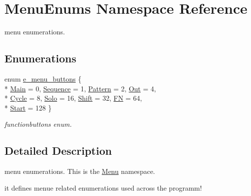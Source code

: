 \hypertarget{namespaceMenuEnums}{\section{Menu\-Enums Namespace Reference}
\label{namespaceMenuEnums}
}


menu enumerations.  


\subsection*{Enumerations}
\begin{DoxyCompactItemize}
\item 
enum \hyperlink{namespaceMenuEnums_a8a0112033fd82b21fb91024f2da815db}{e\-\_\-menu\-\_\-buttons} \{ \\*
\hyperlink{namespaceMenuEnums_a8a0112033fd82b21fb91024f2da815dba35174bcb834b5288e617b5e403916282}{Main} = 0, 
\hyperlink{namespaceMenuEnums_a8a0112033fd82b21fb91024f2da815dbac342bed09bcc9a5d2e4c80c6cbac4e42}{Sequence} = 1, 
\hyperlink{namespaceMenuEnums_a8a0112033fd82b21fb91024f2da815dba3775e44f7da30c57fe300475a573e024}{Pattern} = 2, 
\hyperlink{namespaceMenuEnums_a8a0112033fd82b21fb91024f2da815dbafc27e347494357604e497db2c2a07be0}{Out} = 4, 
\\*
\hyperlink{namespaceMenuEnums_a8a0112033fd82b21fb91024f2da815dbad31732cb8f9cbf4c6d27adcc749bc636}{Cycle} = 8, 
\hyperlink{namespaceMenuEnums_a8a0112033fd82b21fb91024f2da815dbaf1ead4564553031959e56857c8f29b57}{Solo} = 16, 
\hyperlink{namespaceMenuEnums_a8a0112033fd82b21fb91024f2da815dba14c45f0470352eebdf23571c855bb77d}{Shift} = 32, 
\hyperlink{namespaceMenuEnums_a8a0112033fd82b21fb91024f2da815dba9bb0e4755281d36cb67e663da534171b}{F\-N} = 64, 
\\*
\hyperlink{namespaceMenuEnums_a8a0112033fd82b21fb91024f2da815dba91e3e422ba63a9de93a637f0dd7ffbf5}{Start} = 128
 \}
\begin{DoxyCompactList}\small\item\em functionbuttons enum. \end{DoxyCompactList}\end{DoxyCompactItemize}


\subsection{Detailed Description}
menu enumerations. This is the \hyperlink{classMenu}{Menu} namespace.\par
 it defines menue related enumerations used across the programm! 

